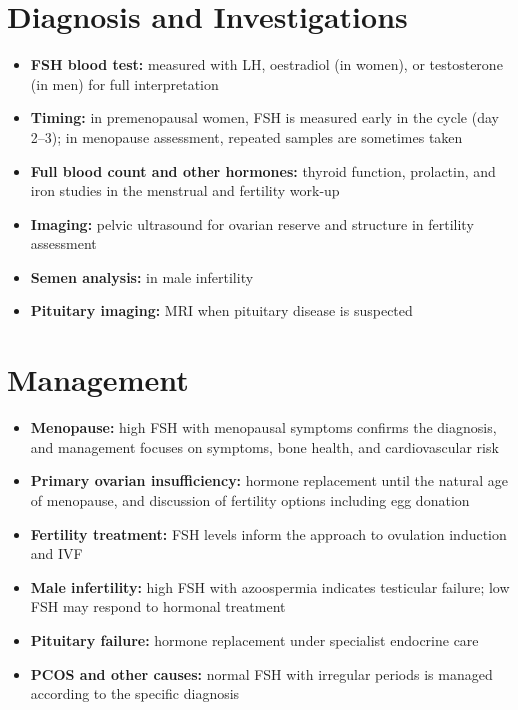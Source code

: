 \section*{Diagnosis and Investigations}
\begin{itemize}
    \item \textbf{FSH blood test:} measured with LH, oestradiol (in women), or testosterone (in men) for full interpretation
    \item \textbf{Timing:} in premenopausal women, FSH is measured early in the cycle (day 2--3); in menopause assessment, repeated samples are sometimes taken
    \item \textbf{Full blood count and other hormones:} thyroid function, prolactin, and iron studies in the menstrual and fertility work-up
    \item \textbf{Imaging:} pelvic ultrasound for ovarian reserve and structure in fertility assessment
    \item \textbf{Semen analysis:} in male infertility
    \item \textbf{Pituitary imaging:} MRI when pituitary disease is suspected
\end{itemize}

\section*{Management}
\begin{itemize}
    \item \textbf{Menopause:} high FSH with menopausal symptoms confirms the diagnosis, and management focuses on symptoms, bone health, and cardiovascular risk
    \item \textbf{Primary ovarian insufficiency:} hormone replacement until the natural age of menopause, and discussion of fertility options including egg donation
    \item \textbf{Fertility treatment:} FSH levels inform the approach to ovulation induction and IVF
    \item \textbf{Male infertility:} high FSH with azoospermia indicates testicular failure; low FSH may respond to hormonal treatment
    \item \textbf{Pituitary failure:} hormone replacement under specialist endocrine care
    \item \textbf{PCOS and other causes:} normal FSH with irregular periods is managed according to the specific diagnosis
\end{itemize}

